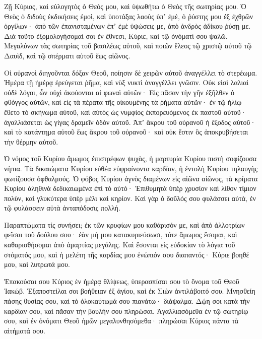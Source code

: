 \begin{spacing}{1.1}
\begin{multicols}{2}
Ζῇ Κύριος, καὶ εὐλογητὸς ὁ Θεός μου, καὶ ὑψωθήτω ὁ Θεὸς τῆς σωτηρίας μου.
Ὁ Θεὸς ὁ διδοὺς ἐκδικήσεις ἐμοὶ, καὶ ὑποτάξας λαοὺς ὑπʼ ἐμὲ,
ὁ ῥύστης μου ἐξ ἐχθρῶν ὀργίλων· ἀπὸ τῶν ἐπανισταμένων ἐπʼ ἐμὲ ὑψώσεις με, ἀπὸ ἀνδρὸς ἀδίκου ῥύσῃ με.
Διὰ τοῦτο ἐξομολογήσομαί σοι ἐν ἔθνεσι, Κύριε, καὶ τῷ ὀνόματί σου ψαλῶ.
Μεγαλύνων τὰς σωτηρίας τοῦ βασιλέως αὐτοῦ, καὶ ποιῶν ἔλεος τῷ χριστῷ αὐτοῦ τῷ Δαυὶδ, καὶ τῷ σπέρματι αὐτοῦ ἕως αἰῶνος.

Οἱ οὐρανοὶ διηγοῦνται δόξαν Θεοῦ, ποίησιν δὲ χειρῶν αὐτοῦ ἀναγγέλλει τὸ στερέωμα.
Ἡμέρα τῇ ἡμέρᾳ ἐρεύγεται ῥῆμα, καὶ νὺξ νυκτὶ ἀναγγέλλει γνῶσιν.
Οὐκ εἰσὶ λαλιαὶ οὐδὲ λόγοι, ὧν οὐχὶ ἀκούονται αἱ φωναὶ αὐτῶν·
Εἰς πᾶσαν τὴν γῆν ἐξῆλθεν ὁ φθόγγος αὐτῶν, καὶ εἰς τὰ πέρατα τῆς οἰκουμένης τὰ ῥήματα αὐτῶν·
ἐν τῷ ἡλίῳ ἔθετο τὸ σκήνωμα αὐτοῦ, καὶ αὐτὸς ὡς νυμφίος ἐκπορευόμενος ἐκ παστοῦ αὐτοῦ· ἀγαλλιάσεται ὡς γίγας δραμεῖν ὁδὸν αὐτοῦ.
Ἀπʼ ἄκρου τοῦ οὐρανοῦ ἡ ἔξοδος αὐτοῦ· καὶ τὸ κατάντημα αὐτοῦ ἕως ἄκρου τοῦ οὐρανοῦ· καὶ οὐκ ἔστιν ὃς ἀποκρυβήσεται τὴν θέρμην αὐτοῦ.

Ὁ νόμος τοῦ Κυρίου ἄμωμος ἐπιστρέφων ψυχὰς, ἡ μαρτυρία Κυρίου πιστὴ σοφίζουσα νήπια.
Τὰ δικαιώματα Κυρίου εὐθέα εὐφραίνοντα καρδίαν, ἡ ἐντολὴ Κυρίου τηλαυγὴς φωτίζουσα ὀφθαλμούς.
Ὁ φόβος Κυρίου ἁγνὸς διαμένων εἰς αἰῶνα αἰῶνος, τὰ κρίματα Κυρίου ἀληθινὰ δεδικαιωμένα ἐπὶ τὸ αὐτό·
Ἐπιθυμητὰ ὑπὲρ χρυσίον καὶ λίθον τίμιον πολὺν, καὶ γλυκύτερα ὑπὲρ μέλι καὶ κηρίον.
Καὶ γὰρ ὁ δοῦλός σου φυλάσσει αὐτὰ, ἐν τῷ φυλάσσειν αὐτὰ ἀνταπόδοσις πολλή.

Παραπτώματα τίς συνήσει; ἐκ τῶν κρυφίων μου καθάρισόν με,
καὶ ἀπὸ ἀλλοτρίων φεῖσαι τοῦ δούλου σου· ἐὰν μή μου κατακυριεύσωσι, τότε ἄμωμος ἔσομαι, καὶ καθαρισθήσομαι ἀπὸ ἁμαρτίας μεγάλης.
Καὶ ἔσονται εἰς εὐδοκίαν τὸ λόγια τοῦ στόματός μου, καὶ ἡ μελέτη τῆς καρδίας μου ἐνώπιόν σου διαπαντός· Κύριε βοηθέ μου, καὶ λυτρωτά μου.

Ἐπακούσαι σου Κύριος ἐν ἡμέρᾳ θλίψεως, ὑπερασπίσαι σου τὸ ὄνομα τοῦ Θεοῦ Ἰακώβ.
Ἐξαποστείλαι σοι βοήθειαν ἐξ ἁγίου, καὶ ἐκ Σιὼν ἀντιλάβοιτό σου.
Μνησθείη πάσης θυσίας σου, καὶ τὸ ὁλοκαύτωμά σου πιανάτω· διάψαλμα.
Δῴη σοι κατὰ τὴν καρδίαν σου, καὶ πᾶσαν τὴν βουλήν σου πληρώσαι.
Ἀγαλλιασόμεθα ἐν τῷ σωτηρίῳ σου, καὶ ἐν ὀνόματι Θεοῦ ἡμῶν μεγαλυνθησόμεθα· πληρώσαι Κύριος πάντα τὰ αἰτήματά σου.


\end{multicols}
\end{spacing}
